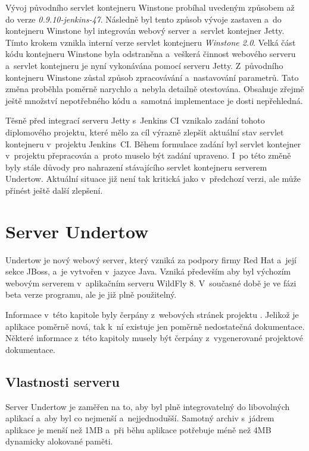         \medskip
        Vývoj původního servlet kontejneru Winstone probíhal uvedeným způsobem 
        až do verze \emph{0.9.10-jenkins-47}. Následně byl tento způsob vývoje zastaven
        a~do kontejneru Winstone byl integrován webový server a~servlet kontejner
        Jetty. Tímto krokem vznikla 
        interní verze servlet kontejneru \emph{Winstone 2.0}. Velká část kódu 
        kontejneru Winstone byla odstraněna a~veškerá činnost webového serveru a~servlet 
        kontejneru je nyní vykonávána pomocí serveru Jetty. Z~původního kontejneru Winstone
        zůstal způsob zpracovávání a~nastavování parametrů. 
        Tato změna proběhla poměrně narychlo
        a~nebyla detailně otestována. Obsahuje zřejmě ještě množství nepotřebného kódu
        a~samotná implementace je dosti nepřehledná.

        
        \medskip
        Těsně před integrací serveru Jetty s~Jenkins CI
        vznikalo zadání tohoto diplomového projektu, které mělo za cíl
        výrazně zlepšit aktuální stav servlet kontejneru v~projektu Jenkins~CI. Během
        formulace zadání byl servlet kontejner v~projektu přepracován a~proto
        muselo být zadání upraveno. I~po této změně byly stále důvody pro 
        nahrazení stávajícího servlet kontejneru serverem Undertow.
        Aktuální situace již není tak kritická jako v~předchozí verzi,
        ale může přinést ještě další zlepšení.
                

    \section{Server Undertow} \label{undertow}
        Undertow je nový webový server, který vzniká za podpory firmy Red Hat a~její sekce JBoss,
        a~je vytvořen v~jazyce Java. 
        Vzniká především aby byl výchozím webovým serverem v~aplikačním serveru WildFly 8.
        V~současné době je ve fázi beta verze programu, ale je již plně použitelný.

        Informace v~této kapitole byly čerpány z~webových stránek projektu \cite{undertowWeb}.
        Jelikož je aplikace poměrně nová, tak k~ní existuje jen poměrně nedostatečná 
        dokumentace. Některé informace z~této kapitoly musely být čerpány
        z~vygenerované projektové dokumentace.

        \subsection{Vlastnosti serveru}
            Server Undertow je zaměřen na to, aby byl plně integrovatelný do libovolných aplikací
            a~aby byl co nejmenší a~nejjednodušší. Samotný
            archiv s~jádrem aplikace je menší než 1MB a~při běhu aplikace potřebuje
            méně než 4MB dynamicky alokované paměti. 

